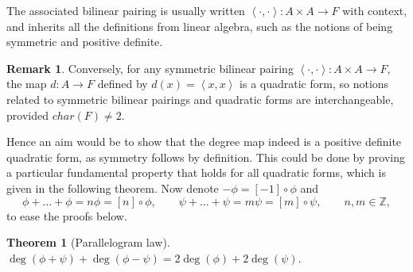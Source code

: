 \documentclass{article}
\newcommand{\Z}{\mathbb{Z}}
\newcommand{\rb}[1]{\left( #1 \right)}
\renewcommand{\sb}[1]{\left[ #1 \right]}
\newcommand{\ab}[1]{\left\langle #1 \right\rangle}
\theoremstyle{definition}
\newtheorem*{remark}{Remark}
\newtheorem{theorem}[proposition]{Theorem}
\begin{document}
The associated bilinear pairing is usually written $ \ab{\cdot, \cdot} : A \times A \to F $ with context, and inherits all the definitions from linear algebra, such as the notions of being symmetric and positive definite.

\begin{remark}
Conversely, for any symmetric bilinear pairing $ \ab{\cdot, \cdot} : A \times A \to F $, the map $ d : A \to F $ defined by $ d\rb{x} = \ab{x, x} $ is a quadratic form, so notions related to symmetric bilinear pairings and quadratic forms are interchangeable, provided $ char\rb{F} \ne 2 $.
\end{remark}

Hence an aim would be to show that the degree map indeed is a positive definite quadratic form, as symmetry follows by definition. This could be done by proving a particular fundamental property that holds for all quadratic forms, which is given in the following theorem. Now denote $ -\phi = \sb{-1} \circ \phi $ and
$$ \phi + \dots + \phi = n\phi = \sb{n} \circ \phi, \qquad \psi + \dots + \psi = m\psi = \sb{m} \circ \psi, \qquad n, m \in \Z, $$
to ease the proofs below.

\begin{theorem}[Parallelogram law]
$ \deg\rb{\phi + \psi} + \deg\rb{\phi - \psi} = 2\deg\rb{\phi} + 2\deg\rb{\psi} $.
\end{theorem}
\end{document}
